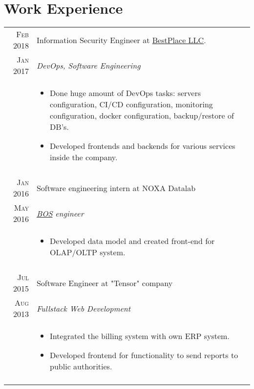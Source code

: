 \documentclass[a4paper,10pt]{article}
\begin{document}
\section{Work Experience}
\begin{tabular}{r|p{11cm}}
 \textsc{Feb 2018} & Information Security Engineer at \href{https://bestplace.ai}{BestPlace LLC}. \\\textsc{Jan 2017}&\emph{DevOps, Software Engineering}\\&\footnotesize{
 \begin{itemize}
 \item Done huge amount of DevOps tasks: servers configuration, CI/CD configuration, monitoring configuration, docker configuration, backup/restore of DB's.
 \item Developed frontends and backends for various services inside the company.
 \end{itemize}
 }\\\multicolumn{2}{c}{} \\
 \textsc{Jan 2016} & Software engineering intern at NOXA Datalab \\\textsc{May 2016}&\emph{\href{https://www.intel.com/content/dam/www/public/us/en/documents/solution-briefs/nomura-bos-solution-brief.pdf}{BOS} engineer}\\&\footnotesize{
 \begin{itemize}
 \item Developed data model and created front-end for OLAP/OLTP system.
 \end{itemize}
 }\\\multicolumn{2}{c}{}\\
 \textsc{Jul 2015} & Software Engineer at "Tensor" company \\\textsc{Aug 2013}&\emph{Fullstack Web Development}\\&
 \footnotesize{
 \begin{itemize}
 \item Integrated the billing system with own ERP system.
 \item Developed frontend for functionality to send reports to public authorities.
 \end{itemize}
 }\\
 \multicolumn{2}{c}{} \\
\end{tabular}
\end{document}
